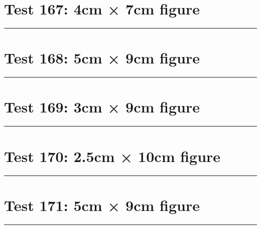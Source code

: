 \documentclass[a4paper,11pt]{article}
\begin{document}
\section*{Test 167: 4cm × 7cm figure}
\begin{swarmwrap}%
  \begin{minipage}[t]{4cm}
    \centering
    \rule{\linewidth}{7cm}
  \end{minipage}%
\end{swarmwrap}%
\swarmwrapnext
\lipsum[109]
\lipsum[110]
\lipsum[111]
\section*{Test 168: 5cm × 9cm figure}
\begin{swarmwrap}%
  \begin{minipage}[t]{5cm}
    \centering
    \rule{\linewidth}{9cm}
  \end{minipage}%
\end{swarmwrap}%
\swarmwrapnext
\lipsum[112]
\lipsum[113]
\lipsum[114]
\section*{Test 169: 3cm × 9cm figure}
\begin{swarmwrap}%
  \begin{minipage}[t]{3cm}
    \centering
    \rule{\linewidth}{9cm}
  \end{minipage}%
\end{swarmwrap}%
\swarmwrapnext
\lipsum[113]
\lipsum[114]
\lipsum[115]
\lipsum[116]
\section*{Test 170: 2.5cm × 10cm figure}
\begin{swarmwrap}%
  \begin{minipage}[t]{2cm}
    \centering
    \rule{\linewidth}{10cm}
  \end{minipage}%
\end{swarmwrap}%
\swarmwrapnext
\lipsum[139]
\lipsum[140]
\lipsum[141]
\lipsum[142]
\lipsum[143]
\section*{Test 171: 5cm × 9cm figure}
\begin{swarmwrap}%
  \begin{minipage}[t]{5cm}
    \centering
    \rule{\linewidth}{9cm}
  \end{minipage}%
\end{swarmwrap}%
\swarmwrapnext
\lipsum[113]
\lipsum[114]
\lipsum[115]
\lipsum[116]
\lipsum[117]
\lipsum[118]
\end{document}
